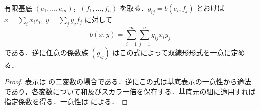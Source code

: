 \begin{prop}[双線形形式の基底に関する係数表示]
有限基底 $(e_1,\ldots,e_m)$，$(f_1,\ldots,f_n)$ を取る．$g_{ij}=b(e_i,f_j)$ とおけば $x=\sum_i x_ie_i,\ y=\sum_j y_jf_j$ に対して
\[
 b(x,y)=\sum_{i=1}^m\sum_{j=1}^n g_{ij}x_i y_j
\]
である．逆に任意の係数族 $(g_{ij})$ はこの式によって双線形形式を一意に定める．
\end{prop}
\begin{proof}
表示は の二変数の場合である．逆にこの式は基底表示の一意性から適法であり，各変数について和及びスカラー倍を保存する．基底元の組に適用すれば指定係数を得る．一意性は による．
\end{proof}
